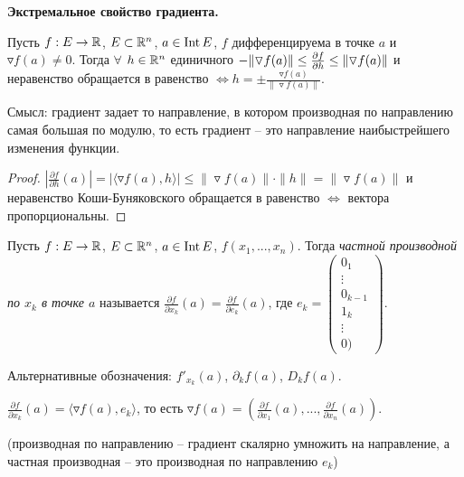 \begin{theorem}
    \textbf{Экстремальное свойство градиента.}

    Пусть $f: E\rightarrow \mathbb{R}$, $E\subset \mathbb{R}^n$, $a\in \operatorname{Int} E$, $f$ дифференцируема в точке $a$ и $\triangledown f(a)\neq 0$. Тогда $\forall$ $h\in \mathbb{R}^n$ единичного $-\|\triangledown f(a)\|\leq \partialderivative{f}{h}(a) \leq \|\triangledown  f(a)\|$ и неравенство обращается в равенство $\Leftrightarrow h=\pm \frac{\triangledown f(a)}{\|\triangledown f(a)\|}$.
\end{theorem}

\begin{remark}
    Смысл: градиент задает то направление, в котором производная по направлению самая большая по модулю, то есть градиент – это направление наибыстрейшего изменения функции.
\end{remark}

\begin{proof}
    $|\frac{\partial f}{\partial h}(a)|=|\langle\triangledown f(a), h \rangle|\leq \|\triangledown f(a)\|\cdot \|h\|=\|\triangledown f(a)\|$ и неравенство Коши-Буняковского обращается в равенство $\Leftrightarrow$ вектора пропорциональны.
\end{proof}

\begin{definition}
    Пусть  $f: E\rightarrow \mathbb{R}$, $E\subset \mathbb{R}^n$, $a\in \operatorname{Int} E$, $f(x_1, ..., x_n)$. Тогда \textit{частной производной по $x_k$ в точке $a$} называется $\frac{\partial f}{\partial x_k}(a)=\frac{\partial f}{\partial e_k}(a)$, где $e_k=\begin{pmatrix}
        0_1 \\ \vdots \\ 0_{k-1} \\ 1_k \\ \vdots \\ 0)
    \end{pmatrix}$.

    Альтернативные обозначения: $f'_{x_k}(a)$, $ \partial_kf(a)$, $D_k f(a)$.
\end{definition}

\begin{statement}
    $\frac{\partial f}{\partial x_k}(a)=\langle \triangledown f(a), e_k\rangle$, то есть $\triangledown f(a)= (\frac{\partial f}{\partial x_1}(a), ..., \frac{\partial  f}{\partial x_n}(a))$.

    (производная по направлению – градиент скалярно умножить на направление, а частная производная – это производная по направлению $e_k$)
\end{statement}

